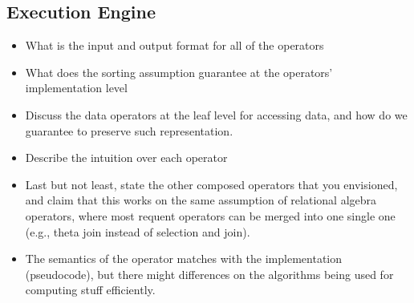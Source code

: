 
\subsection{Execution Engine} \label{ssec:xltlf}
\begin{itemize}
		\item What is the input and output format for all of the operators
	\item What does the sorting assumption guarantee at the operators' implementation level
	\item Discuss the data operators at the leaf level for accessing data, and how do we guarantee to preserve such representation.
	\item Describe the intuition over each operator
	\item Last but not least, state the other composed operators that you envisioned, and claim that this works on the same assumption of relational algebra operators, where most requent operators can be merged into one single one (e.g., theta join instead of selection and join).
	\item The semantics of the operator matches with the implementation (pseudocode), but there might differences on the algorithms being used for computing stuff efficiently.
\end{itemize}